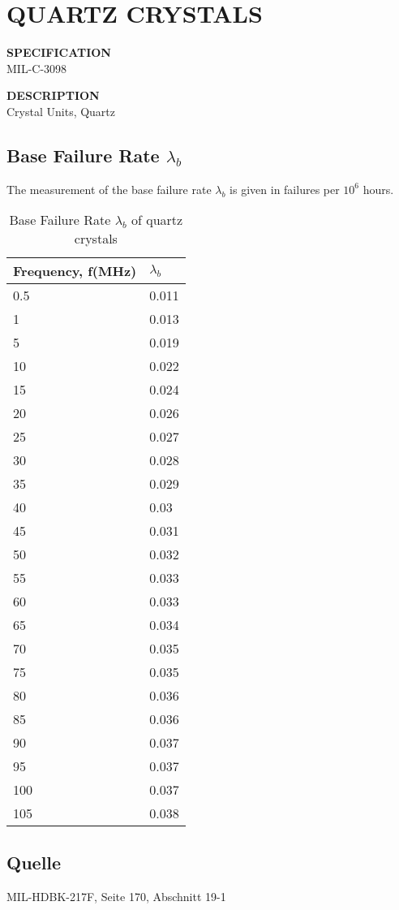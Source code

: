 \section{QUARTZ CRYSTALS}

\begin{minipage}[t]{0.29\textwidth}
    \textbf{SPECIFICATION}\\
    MIL-C-3098
\end{minipage}
\begin{minipage}[t]{0.7\textwidth}
    \textbf{DESCRIPTION}\\
    Crystal Units, Quartz
\end{minipage}

\subsection{Base Failure Rate $\lambda_b$}
The measurement of the base failure rate $\lambda_b$ is given in failures per $10^6$ hours.
\begin{table}[ht]
{\centering

\begin{tabular}{|p{3cm}|p{3cm}|}
    \hline
    \textbf{Frequency, f(MHz)} & \textbf{$\lambda_b$} \\
    \hline
    0.5 & 0.011 \\
    \hline
    1 & 0.013 \\
    \hline
    5 & 0.019 \\
    \hline
    10 & 0.022 \\
    \hline
    15 & 0.024 \\
    \hline
    20 & 0.026 \\
    \hline
    25 & 0.027 \\
    \hline
    30 & 0.028 \\
    \hline
    35 & 0.029 \\
    \hline
    40 & 0.03 \\
    \hline
    45 & 0.031 \\
    \hline
    50 & 0.032 \\
    \hline
    55 & 0.033 \\
    \hline
    60 & 0.033 \\
    \hline
    65 & 0.034 \\
    \hline
    70 & 0.035 \\
    \hline
    75 & 0.035 \\
    \hline
    80 & 0.036 \\
    \hline
    85 & 0.036 \\
    \hline
    90 & 0.037 \\
    \hline
    95 & 0.037 \\
    \hline
    100 & 0.037 \\
    \hline
    105 & 0.038 \\
    \hline
\end{tabular}

\caption{Base Failure Rate $\lambda_b$ of quartz crystals}

\label{tab:bfr_quartz_crystals}
\par}
\end{table}
\subsection*{Quelle}
MIL-HDBK-217F, Seite 170, Abschnitt 19-1